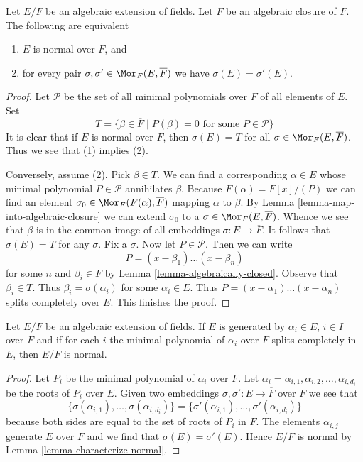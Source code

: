 \begin{lemma}
\label{lemma-characterize-normal}
Let $E/F$ be an algebraic extension of fields. Let $\overline{F}$ be an
algebraic closure of $F$. The following are equivalent
\begin{enumerate}
\item $E$ is normal over $F$, and
\item for every pair $\sigma, \sigma' \in \Mor_F(E, \overline{F})$ we
have $\sigma(E) = \sigma'(E)$.
\end{enumerate}
\end{lemma}

\begin{proof}
Let $\mathcal{P}$ be the set of all minimal polynomials over $F$ of
all elements of $E$. Set
$$
T =
\{\beta \in \overline{F} \mid P(\beta) = 0\text{ for some }P \in \mathcal{P}\}
$$
It is clear that if $E$ is normal over $F$, then $\sigma(E) = T$
for all $\sigma \in \Mor_F(E, \overline{F})$. Thus we see that (1)
implies (2).

\medskip\noindent
Conversely, assume (2). Pick $\beta \in T$.
We can find a corresponding $\alpha \in E$ whose minimal polynomial
$P \in \mathcal{P}$ annihilates $\beta$. Because $F(\alpha) = F[x]/(P)$
we can find an element $\sigma_0 \in \Mor_F(F(\alpha), \overline{F})$ mapping
$\alpha$ to $\beta$. By Lemma \ref{lemma-map-into-algebraic-closure}
we can extend $\sigma_0$ to a $\sigma \in \Mor_F(E, \overline{F})$.
Whence we see that $\beta$ is in the common image of all embeddings
$\sigma : E \to \overline{F}$. It follows that $\sigma(E) = T$
for any $\sigma$. Fix a $\sigma$. Now let $P \in \mathcal{P}$. Then we
can write
$$
P = (x - \beta_1) \ldots (x - \beta_n)
$$
for some $n$ and $\beta_i \in \overline{F}$ by
Lemma \ref{lemma-algebraically-closed}. Observe that $\beta_i \in T$.
Thus $\beta_i = \sigma(\alpha_i)$ for some $\alpha_i \in E$. Thus
$P = (x - \alpha_1) \ldots (x - \alpha_n)$ splits completely over $E$.
This finishes the proof.
\end{proof}

\begin{lemma}
\label{lemma-normally-generated}
Let $E/F$ be an algebraic extension of fields.
If $E$ is generated by $\alpha_i \in E$, $i \in I$
over $F$ and if for each $i$ the minimal polynomial
of $\alpha_i$ over $F$ splits completely in $E$, then
$E/F$ is normal.
\end{lemma}

\begin{proof}
Let $P_i$ be the minimal polynomial of $\alpha_i$ over $F$.
Let $\alpha_i = \alpha_{i, 1}, \alpha_{i, 2}, \ldots, \alpha_{i, d_i}$
be the roots of $P_i$ over $E$. Given two embeddings
$\sigma, \sigma' : E \to \overline{F}$ over $F$ we see that
$$
\{\sigma(\alpha_{i, 1}), \ldots, \sigma(\alpha_{i, d_i})\} =
\{\sigma'(\alpha_{i, 1}), \ldots, \sigma'(\alpha_{i, d_i})\}
$$
because both sides are equal to the set of roots of $P_i$
in $\overline{F}$. The elements $\alpha_{i, j}$
generate $E$ over $F$ and we find that $\sigma(E) = \sigma'(E)$.
Hence $E/F$ is normal by Lemma \ref{lemma-characterize-normal}.
\end{proof}

